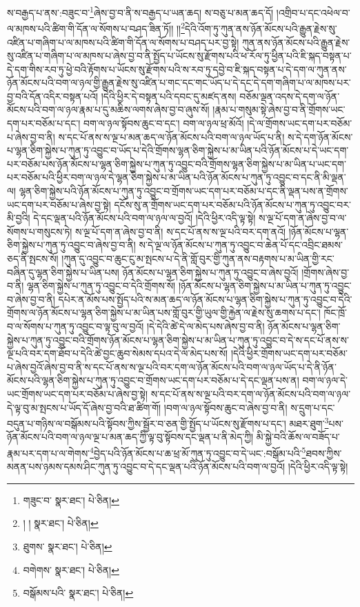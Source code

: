ས་བརྒྱད་པ་ནས་:བཟུང་བ་\footnote{གཟུང་བ་  སྣར་ཐང་།  པེ་ཅིན། }ཞེས་བྱ་བ་ནི་ས་བརྒྱད་པ་ཡན་ཆད། ས་བཅུ་པ་མན་ཆད་དོ། །འགྲིབ་པ་དང་འཕེལ་བ་ལ་མཁས་པའི་ཚིག་གི་དོན་ལ་སོགས་པ་བཤད་ཟིན་ཏོ།། །།\footnote{། །  སྣར་ཐང་།  པེ་ཅིན། }དེའི་འོག་ཏུ་ཀུན་ནས་ཉོན་མོངས་པའི་རྒྱུན་རྗེས་སུ་འཛིན་པ་གཞིག་པ་ལ་མཁས་པའི་ཚིག་གི་དོན་ལ་སོགས་པ་བཤད་པར་བྱ་སྟེ། ཀུན་ནས་ཉོན་མོངས་པའི་རྒྱུན་རྗེས་སུ་འཛིན་པ་གཞིག་པ་ལ་མཁས་པ་ཞེས་བྱ་བ་ནི་སྤྱོད་པ་ཡོངས་སུ་རྫོགས་པའི་ཕ་རོལ་ཏུ་ཕྱིན་པའི་ཇི་སྐད་བསྟན་པ་དེ་དག་གིས་རབ་ཏུ་ཕྱེ་བའི་རྟོགས་པ་ཡོངས་སུ་རྫོགས་པའི་ས་རབ་ཏུ་དབྱེ་བ་ཇི་སྐད་བསྟན་པ་དེ་དག་ལ་ཀུན་ནས་ཉོན་མོངས་པའི་བག་ལ་ཉལ་གྱི་རྒྱུན་རྗེས་སུ་འཛིན་པ་གང་དང་གང་ཡོད་པ་དེ་དང་དེ་དག་གཞིག་པ་ལ་མཁས་པར་བྱ་བའི་དོན་འདིར་བསྟན་པའོ། །དེའི་ཕྱིར་དེ་བསྟན་པའི་དབང་དུ་མཛད་ནས། བཅོམ་ལྡན་འདས་དེ་དག་ལ་ཉོན་མོངས་པའི་བག་ལ་ཉལ་རྣམ་པ་དུ་མཆིས་ལགས་ཞེས་བྱ་བ་ཞུས་སོ། །རྣམ་པ་གསུམ་སྟེ་ཞེས་བྱ་བ་ནི་གྲོགས་ཡང་དག་པར་བཅོམ་པ་དང་། བག་ལ་ཉལ་སྟོབས་ཆུང་བ་དང་། བག་ལ་ཉལ་ཕྲ་མོའོ། །དེ་ལ་གྲོགས་ཡང་དག་པར་བཅོམ་པ་ཞེས་བྱ་བ་ནི། ས་དང་པོ་ནས་ས་ལྔ་པ་མན་ཆད་ལ་ཉོན་མོངས་པའི་བག་ལ་ཉལ་ཡོད་པ་ནི། ས་དེ་དག་ཉོན་མོངས་པ་ལྷན་ཅིག་སྐྱེས་པ་ཀུན་ཏུ་འབྱུང་བ་ཡོད་པ་དེའི་གྲོགས་ལྷན་ཅིག་སྐྱེས་པ་མ་ཡིན་པའི་ཉོན་མོངས་པ་དེ་ཡང་དག་པར་བཅོམ་པས་ཉོན་མོངས་པ་ལྷན་ཅིག་སྐྱེས་པ་ཀུན་ཏུ་འབྱུང་བའི་གྲོགས་ལྷན་ཅིག་སྐྱེས་པ་མ་ཡིན་པ་ཡང་དག་པར་བཅོམ་པའི་ཕྱིར་བག་ལ་ཉལ་དེ་ལྷན་ཅིག་སྐྱེས་པ་མ་ཡིན་པའི་ཉོན་མོངས་པ་ཀུན་ཏུ་འབྱུང་བ་དང་ནི་མི་ལྡན་ལ། ལྷན་ཅིག་སྐྱེས་པའི་ཉོན་མོངས་པ་ཀུན་ཏུ་འབྱུང་བ་གྲོགས་ཡང་དག་པར་བཅོམ་པ་དང་ནི་ལྡན་པས་ན་གྲོགས་ཡང་དག་པར་བཅོམ་པ་ཞེས་བྱ་སྟེ། དངོས་སུ་ན་གྲོགས་ཡང་དག་པར་བཅོམ་པའི་ཉོན་མོངས་པ་ཀུན་ཏུ་འབྱུང་བར་མི་བྱའི། དེ་དང་ལྡན་པའི་ཉོན་མོངས་པའི་བག་ལ་ཉལ་ལ་བྱའོ། །དེའི་ཕྱིར་འདི་ལྟ་སྟེ། ས་ལྔ་པོ་དག་ན་ཞེས་བྱ་བ་ལ་སོགས་པ་གསུངས་ཏེ། ས་ལྔ་པོ་དག་ན་ཞེས་བྱ་བ་ནི། ས་དང་པོ་ནས་ས་ལྔ་པའི་བར་དག་ནའོ། །ཉོན་མོངས་པ་ལྷན་ཅིག་སྐྱེས་པ་ཀུན་ཏུ་འབྱུང་བ་ཞེས་བྱ་བ་ནི། ས་དེ་ལྔ་ལ་ཉོན་མོངས་པ་ཀུན་ཏུ་འབྱུང་བ་ཆེན་པོ་དང་འབྲིང་ཐམས་ཅད་ནི་སྤངས་སོ། །ཀུན་དུ་འབྱུང་བ་ཆུང་ངུ་མ་སྤངས་པ་དེ་ནི་གློ་བུར་གྱི་ཀུན་ནས་བརྟགས་པ་མ་ཡིན་གྱི་རང་བཞིན་དུ་ལྷན་ཅིག་སྐྱེས་པ་ཡིན་པས། ཉོན་མོངས་པ་ལྷན་ཅིག་སྐྱེས་པ་ཀུན་ཏུ་འབྱུང་བ་ཞེས་བྱའོ། །གྲོགས་ཞེས་བྱ་བ་ནི། ལྷན་ཅིག་སྐྱེས་པ་ཀུན་ཏུ་འབྱུང་བ་དེའི་གྲོགས་སོ། །ཉོན་མོངས་པ་ལྷན་ཅིག་སྐྱེས་པ་མ་ཡིན་པ་ཀུན་ཏུ་འབྱུང་བ་ཞེས་བྱ་བ་ནི། དཔེར་ན་མོས་པས་སྤྱོད་པའི་ས་མན་ཆད་ལ་ཉོན་མོངས་པ་ལྷན་ཅིག་སྐྱེས་པ་ཀུན་ཏུ་འབྱུང་བ་དེའི་གྲོགས་ལ་ཉོན་མོངས་པ་ལྷན་ཅིག་སྐྱེས་པ་མ་ཡིན་པས་གློ་བུར་གྱི་ཡུལ་གྱི་རྐྱེན་ལ་རྗེས་སུ་ཆགས་པ་དང་། ཁོང་ཁྲོ་བ་ལ་སོགས་པ་ཀུན་ཏུ་འབྱུང་བ་ལྟ་བུ་ལ་བྱའོ། །དེ་དེའི་ཚེ་དེ་ལ་མེད་པས་ཞེས་བྱ་བ་ནི། ཉོན་མོངས་པ་ལྷན་ཅིག་སྐྱེས་པ་ཀུན་ཏུ་འབྱུང་བའི་གྲོགས་ཉོན་མོངས་པ་ལྷན་ཅིག་སྐྱེས་པ་མ་ཡིན་པ་ཀུན་ཏུ་འབྱུང་བ་དེ་ས་དང་པོ་ནས་ས་ལྔ་པའི་བར་དག་ཐོབ་པ་དེའི་ཚེ་བྱང་ཆུབ་སེམས་དཔའ་དེ་ལ་མེད་པས་སོ། །དེའི་ཕྱིར་གྲོགས་ཡང་དག་པར་བཅོམ་པ་ཞེས་བྱའོ་ཞེས་བྱ་བ་ནི་ས་དང་པོ་ནས་ས་ལྔ་པའི་བར་དག་ལ་ཉོན་མོངས་པའི་བག་ལ་ཉལ་ཡོད་པ་དེ་ནི་ཉོན་མོངས་པའི་ལྷན་ཅིག་སྐྱེས་པ་ཀུན་ཏུ་འབྱུང་བ་གྲོགས་ཡང་དག་པར་བཅོམ་པ་དེ་དང་ལྡན་པས་ན། བག་ལ་ཉལ་དེ་ཡང་གྲོགས་ཡང་དག་པར་བཅོམ་པ་ཞེས་བྱ་སྟེ། ས་དང་པོ་ནས་ས་ལྔ་པའི་བར་དག་ལ་ཉོན་མོངས་པའི་བག་ལ་ཉལ་དེ་ལྟ་བུ་མ་སྤངས་པ་ཡོད་དོ་ཞེས་བྱ་བའི་ཐ་ཚིག་གོ། །བག་ལ་ཉལ་སྟོབས་ཆུང་བ་ཞེས་བྱ་བ་ནི། ས་དྲུག་པ་དང་བདུན་པ་གཉིས་ལ་བསྒོམས་པའི་སྟོབས་ཀྱིས་སྦྱོར་བ་ཅན་གྱི་སྤྱོད་པ་ཡོངས་སུ་རྫོགས་པ་དང་། མཐར་ཐུག་\footnote{ཐུགས་  སྣར་ཐང་།  པེ་ཅིན། }པས་ཉོན་མོངས་པའི་བག་ལ་ཉལ་ལྔ་པ་མན་ཆད་ཀྱི་ལྟ་བུ་སྟོབས་དང་ལྡན་པ་ནི་མེད་ཀྱི། མི་སྐྱེ་བའི་ཆོས་ལ་བཟོད་པ་རྣམ་པར་དག་པ་ལ་གེགས་\footnote{བགེགས་  སྣར་ཐང་།  པེ་ཅིན། }བྱེད་པའི་ཉོན་མོངས་པ་ཆ་ཕྲ་མོ་ཀུན་ཏུ་འབྱུང་བ་དེ་ཡང་:བསྒོམ་པའི་\footnote{བསྒོམས་པའི་  སྣར་ཐང་།  པེ་ཅིན། }ཐབས་ཀྱིས་མནན་པས་ཉམས་དམས་ཤིང་ཀུན་ཏུ་འབྱུང་བ་དེ་དང་ལྡན་པའི་ཉོན་མོངས་པའི་བག་ལ་བྱའོ། །དེའི་ཕྱིར་འདི་ལྟ་སྟེ། 